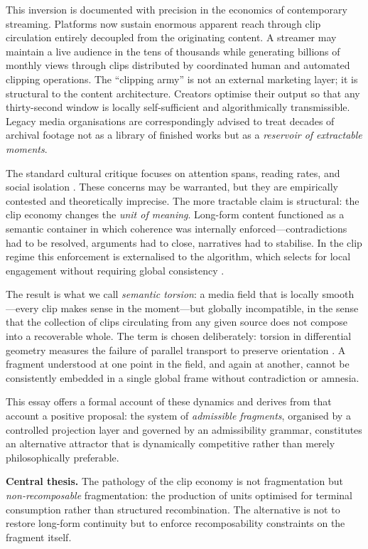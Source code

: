 \documentclass{amsart}
\theoremstyle{plain}
\theoremstyle{definition}
\theoremstyle{remark}
\begin{document}
This inversion is documented with precision in the economics of contemporary
streaming.  Platforms now sustain enormous apparent reach through clip circulation
entirely decoupled from the originating content.  A streamer may maintain a live
audience in the tens of thousands while generating billions of monthly views through
clips distributed by coordinated human and automated clipping operations.  The
``clipping army'' is not an external marketing layer; it is structural to the
content architecture.  Creators optimise their output so that any thirty-second
window is locally self-sufficient and algorithmically transmissible.  Legacy media
organisations are correspondingly advised to treat decades of archival footage not
as a library of finished works but as a \emph{reservoir of extractable moments}.

The standard cultural critique focuses on attention spans, reading rates, and
social isolation \cite{postman1985,han2015}.  These concerns may be warranted, but
they are empirically contested and theoretically imprecise.  The more tractable
claim is structural: the clip economy changes the \emph{unit of meaning}.  Long-form
content functioned as a semantic container in which coherence was internally
enforced---contradictions had to be resolved, arguments had to close, narratives had
to stabilise.  In the clip regime this enforcement is externalised to the algorithm,
which selects for local engagement without requiring global consistency
\cite{pariser2011,zeynep2015}.

The result is what we call \emph{semantic torsion}: a media field that is locally
smooth---every clip makes sense in the moment---but globally incompatible, in the
sense that the collection of clips circulating from any given source does not
compose into a recoverable whole.  The term is chosen deliberately: torsion in
differential geometry measures the failure of parallel transport to preserve
orientation \cite{munkres2000}.  A fragment understood at one point in the field,
and again at another, cannot be consistently embedded in a single global frame
without contradiction or amnesia.

This essay offers a formal account of these dynamics and derives from that account
a positive proposal: the system of \emph{admissible fragments}, organised by a
controlled projection layer and governed by an admissibility grammar, constitutes
an alternative attractor that is dynamically competitive rather than merely
philosophically preferable.

\begin{claimbox}
  \textbf{Central thesis.}  The pathology of the clip economy is not
  fragmentation but \emph{non-recomposable} fragmentation: the production of
  units optimised for terminal consumption rather than structured recombination.
  The alternative is not to restore long-form continuity but to enforce
  recomposability constraints on the fragment itself.
\end{claimbox}
\end{document}
